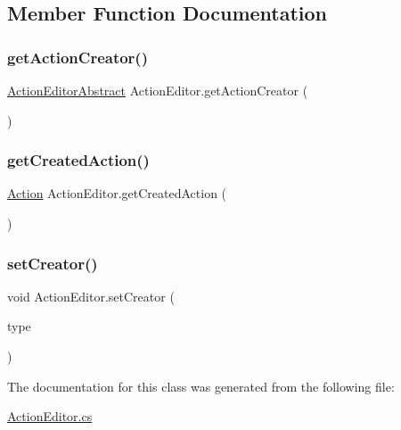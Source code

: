 \subsection{Member Function Documentation}
\mbox{\label{class_action_editor_af3bda8deb9bc2b60162102cf681a2cee}} 
\subsubsection{\texorpdfstring{get\+Action\+Creator()}{getActionCreator()}}
{\footnotesize\ttfamily \mbox{\hyperlink{class_action_editor_abstract}{Action\+Editor\+Abstract}} Action\+Editor.\+get\+Action\+Creator (\begin{DoxyParamCaption}{ }\end{DoxyParamCaption})}

\mbox{\label{class_action_editor_a1b9b9e2aaaf5263be088467c0fdc310f}} 
\subsubsection{\texorpdfstring{get\+Created\+Action()}{getCreatedAction()}}
{\footnotesize\ttfamily \mbox{\hyperlink{class_action}{Action}} Action\+Editor.\+get\+Created\+Action (\begin{DoxyParamCaption}{ }\end{DoxyParamCaption})}

\mbox{\label{class_action_editor_ac134a98ca23fd7c5d95934e9e4d3fd0c}} 
\subsubsection{\texorpdfstring{set\+Creator()}{setCreator()}}
{\footnotesize\ttfamily void Action\+Editor.\+set\+Creator (\begin{DoxyParamCaption}\item[{\mbox{\hyperlink{_action_editor_8cs_a1f6dfc24cb6beb094c3b5a7ad73c805a}{Action\+Creator\+Type}}}]{type }\end{DoxyParamCaption})}



The documentation for this class was generated from the following file\+:\begin{DoxyCompactItemize}
\item 
\mbox{\hyperlink{_action_editor_8cs}{Action\+Editor.\+cs}}\end{DoxyCompactItemize}
